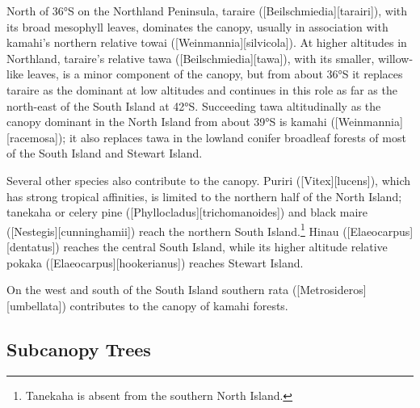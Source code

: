 North of \ang{36}S on the Northland Peninsula, taraire ([Beilschmiedia][tarairi]), with its broad mesophyll leaves, dominates the canopy, usually in association with kamahi's northern relative towai ([Weinmannia][silvicola]).
At higher altitudes in Northland, taraire's relative tawa ([Beilschmiedia][tawa]), with its smaller, willow-like leaves, is a minor component of the canopy, but from about \ang{36}S it replaces taraire as the dominant at low altitudes and continues in this role as far as the north-east of the South Island at \ang{42}S.
Succeeding tawa altitudinally as the canopy dominant in the North Island from about \ang{39}S is kamahi ([Weinmannia][racemosa]); it also replaces tawa in the lowland conifer broadleaf forests of most of the South Island and Stewart Island.

Several other species also contribute to the canopy.
Puriri ([Vitex][lucens]), which has strong tropical affinities, is limited to the northern half of the North Island; tanekaha or celery pine ([Phyllocladus][trichomanoides]) and black maire ([Nestegis][cunninghamii]) reach the northern South Island.\footnote{Tanekaha is absent from the southern North Island.}
Hinau ([Elaeocarpus][dentatus]) reaches the central South Island, while its higher altitude relative pokaka ([Elaeocarpus][hookerianus]) reaches Stewart Island.

On the west and south of the South Island southern rata ([Metrosideros][umbellata]) contributes to the canopy of kamahi forests.

\subsection{Subcanopy Trees}

